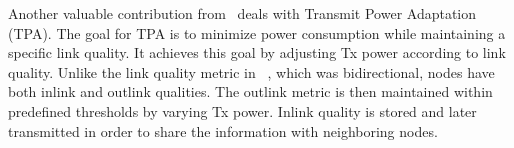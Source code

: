 Another valuable contribution from~\cite{relay:transmitpoweradaptation} deals with Transmit Power Adaptation (TPA). The goal for TPA is to minimize power consumption while maintaining a specific link quality. It achieves this goal by adjusting Tx power according to link quality. Unlike the link quality metric in ~\cite{routing:storeandforward}, which was bidirectional, nodes have both inlink and outlink qualities. The outlink metric is then maintained within predefined thresholds by varying Tx power. Inlink quality is stored and later transmitted in order to share the information with neighboring nodes.



